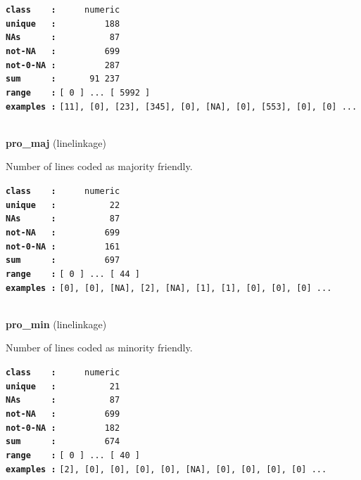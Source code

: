 \documentclass[]{article}
\begin{document}
\textbf{\texttt{class\ \ \ \ :}} \texttt{~~~~~numeric}\\
\textbf{\texttt{unique\ \ \ :}} \texttt{~~~~~~~~~188}\\
\textbf{\texttt{NAs\ \ \ \ \ \ :}} \texttt{~~~~~~~~~~87}\\
\textbf{\texttt{not-NA\ \ \ :}} \texttt{~~~~~~~~~699}\\
\textbf{\texttt{not-0-NA\ :}} \texttt{~~~~~~~~~287}\\
\textbf{\texttt{sum\ \ \ \ \ \ :}} \texttt{~~~~~~91~237}\\
\textbf{\texttt{range\ \ \ \ :}}
\texttt{{[}\ 0\ {]}\ ...\ {[}\ 5992\ {]}}\\
\textbf{\texttt{examples\ :}}
\texttt{{[}11{]},\ {[}0{]},\ {[}23{]},\ {[}345{]},\ {[}0{]},\ {[}NA{]},\ {[}0{]},\ {[}553{]},\ {[}0{]},\ {[}0{]}\ ...}\\

~

\textbf{pro\_maj} (linelinkage)

Number of lines coded as majority friendly.

\textbf{\texttt{class\ \ \ \ :}} \texttt{~~~~~numeric}\\
\textbf{\texttt{unique\ \ \ :}} \texttt{~~~~~~~~~~22}\\
\textbf{\texttt{NAs\ \ \ \ \ \ :}} \texttt{~~~~~~~~~~87}\\
\textbf{\texttt{not-NA\ \ \ :}} \texttt{~~~~~~~~~699}\\
\textbf{\texttt{not-0-NA\ :}} \texttt{~~~~~~~~~161}\\
\textbf{\texttt{sum\ \ \ \ \ \ :}} \texttt{~~~~~~~~~697}\\
\textbf{\texttt{range\ \ \ \ :}}
\texttt{{[}\ 0\ {]}\ ...\ {[}\ 44\ {]}}\\
\textbf{\texttt{examples\ :}}
\texttt{{[}0{]},\ {[}0{]},\ {[}NA{]},\ {[}2{]},\ {[}NA{]},\ {[}1{]},\ {[}1{]},\ {[}0{]},\ {[}0{]},\ {[}0{]}\ ...}\\

~

\textbf{pro\_min} (linelinkage)

Number of lines coded as minority friendly.

\textbf{\texttt{class\ \ \ \ :}} \texttt{~~~~~numeric}\\
\textbf{\texttt{unique\ \ \ :}} \texttt{~~~~~~~~~~21}\\
\textbf{\texttt{NAs\ \ \ \ \ \ :}} \texttt{~~~~~~~~~~87}\\
\textbf{\texttt{not-NA\ \ \ :}} \texttt{~~~~~~~~~699}\\
\textbf{\texttt{not-0-NA\ :}} \texttt{~~~~~~~~~182}\\
\textbf{\texttt{sum\ \ \ \ \ \ :}} \texttt{~~~~~~~~~674}\\
\textbf{\texttt{range\ \ \ \ :}}
\texttt{{[}\ 0\ {]}\ ...\ {[}\ 40\ {]}}\\
\textbf{\texttt{examples\ :}}
\texttt{{[}2{]},\ {[}0{]},\ {[}0{]},\ {[}0{]},\ {[}0{]},\ {[}NA{]},\ {[}0{]},\ {[}0{]},\ {[}0{]},\ {[}0{]}\ ...}\\
\end{document}
